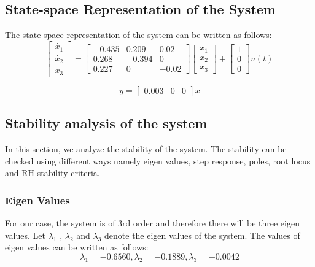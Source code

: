\documentclass{article}
\begin{document}
\subsection{State-space Representation of the System}
The state-space representation of the system can be written as follows:
\begin{equation}
\begin{bmatrix} \dot{x_1}\\  \dot{x_2}\\ \dot{x_3} \end{bmatrix}
= \begin{bmatrix}
-0.435 & 0.209 & 0.02\\
0.268 & -0.394 & 0\\
0.227 & 0 & -0.02\end{bmatrix}
\begin{bmatrix} x_1\\  x_2 \\ x_3 \end{bmatrix} +
\begin{bmatrix}
1 \\
0 \\
0 \end{bmatrix}
u(t)
\end{equation}

\begin{equation}
y=\begin{bmatrix}
0.003 & 0 & 0
\end{bmatrix}x
\end{equation}



\subsection{Stability analysis of the system}
In this section, we analyze the stability of the system. The stability can be checked using different ways namely eigen values, step response, poles, root locus and RH-stability criteria. 

\subsubsection{Eigen Values}
For our case, the system is of 3rd order and therefore there will be three eigen values. Let $\lambda_1$ , $\lambda_2$ and $\lambda_3$ denote the eigen values of the system. The values of eigen values can be written as follows:
\begin{equation} \lambda_1 = -0.6560,  \lambda_2 = -0.1889, \lambda_3 = -0.0042 \end{equation}
   
\end{document}
